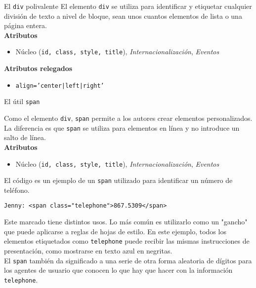\begin{frame}{El \texttt{div} polivalente} %
    El elemento \texttt{div} se utiliza para identificar y etiquetar cualquier
    división de texto a nivel de bloque, sean unos cuantos elementos de lista o
    una página entera. \\[0.4cm]

    \textbf{Atributos}
    \begin{itemize}
        \item Núcleo (\texttt{id, class, style, title}),
        \textit{Internacionalización},  \textit{Eventos}
    \end{itemize}

    \textbf{Atributos relegados}
    \begin{itemize}
        \item \texttt{align='center|left|right'}
    \end{itemize}
\end{frame}

\begin{frame}[fragile]{El útil \texttt{span}} %

\footnotesize{
    Como el elemento \texttt{div}, \texttt{span} permite a los autores crear
    elementos personalizados. La diferencia es que \texttt{span} se utiliza
    para elementos en línea y no introduce un salto de línea.\\[0.1cm]

    \textbf{Atributos}
    \begin{itemize}
        \item Núcleo (\texttt{id, class, style, title}),
        \textit{Internacionalización},  \textit{Eventos}
    \end{itemize}

    El código es un ejemplo de un \texttt{span} utilizado para identificar un
    número de teléfono. 

\begin{lstlisting}
Jenny: <span class="telephone">867.5309</span>
\end{lstlisting}
    
    Este marcado tiene distintos usos. Lo más común es utilizarlo como un
    "gancho" que puede aplicarse a reglas de hojas de estilo. En este ejemplo,
    todos los elementos etiquetados como \texttt{telephone} puede recibir las
    mismas instrucciones de presentación, como mostrarse en texto azul en
    negritas.\\[0.1cm]

    El \texttt{span} también da significado a una serie de otra forma aleatoria
    de dígitos para los agentes de usuario que conocen lo que hay que hacer con
    la información \texttt{telephone}. 

}
\end{frame}

